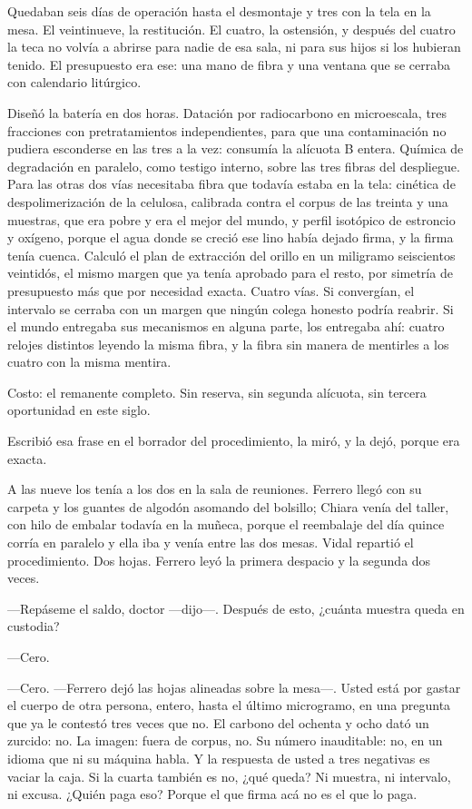 Quedaban seis días de operación hasta el desmontaje y tres con la tela en la mesa. El veintinueve, la restitución. El cuatro, la ostensión, y después del cuatro la teca no volvía a abrirse para nadie de esa sala, ni para sus hijos si los hubieran tenido. El presupuesto era ese: una mano de fibra y una ventana que se cerraba con calendario litúrgico.

Diseñó la batería en dos horas. Datación por radiocarbono en microescala, tres fracciones con pretratamientos independientes, para que una contaminación no pudiera esconderse en las tres a la vez: consumía la alícuota B entera. Química de degradación en paralelo, como testigo interno, sobre las tres fibras del despliegue. Para las otras dos vías necesitaba fibra que todavía estaba en la tela: cinética de despolimerización de la celulosa, calibrada contra el corpus de las treinta y una muestras, que era pobre y era el mejor del mundo, y perfil isotópico de estroncio y oxígeno, porque el agua donde se creció ese lino había dejado firma, y la firma tenía cuenca. Calculó el plan de extracción del orillo en un miligramo seiscientos veintidós, el mismo margen que ya tenía aprobado para el resto, por simetría de presupuesto más que por necesidad exacta. Cuatro vías. Si convergían, el intervalo se cerraba con un margen que ningún colega honesto podría reabrir. Si el mundo entregaba sus mecanismos en alguna parte, los entregaba ahí: cuatro relojes distintos leyendo la misma fibra, y la fibra sin manera de mentirles a los cuatro con la misma mentira.

Costo: el remanente completo. Sin reserva, sin segunda alícuota, sin tercera oportunidad en este siglo.

Escribió esa frase en el borrador del procedimiento, la miró, y la dejó, porque era exacta.

A las nueve los tenía a los dos en la sala de reuniones. Ferrero llegó con su carpeta y los guantes de algodón asomando del bolsillo; Chiara venía del taller, con hilo de embalar todavía en la muñeca, porque el reembalaje del día quince corría en paralelo y ella iba y venía entre las dos mesas. Vidal repartió el procedimiento. Dos hojas. Ferrero leyó la primera despacio y la segunda dos veces.

---Repáseme el saldo, doctor ---dijo---. Después de esto, ¿cuánta muestra queda en custodia?

---Cero.

---Cero. ---Ferrero dejó las hojas alineadas sobre la mesa---. Usted está por gastar el cuerpo de otra persona, entero, hasta el último microgramo, en una pregunta que ya le contestó tres veces que no. El carbono del ochenta y ocho dató un zurcido: no. La imagen: fuera de corpus, no. Su número inauditable: no, en un idioma que ni su máquina habla. Y la respuesta de usted a tres negativas es vaciar la caja. Si la cuarta también es no, ¿qué queda? Ni muestra, ni intervalo, ni excusa. ¿Quién paga eso? Porque el que firma acá no es el que lo paga.


